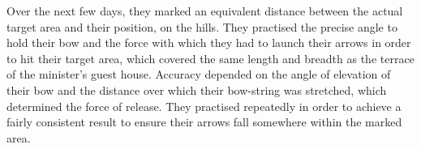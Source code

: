 Over the next few days, they marked an equivalent distance between the actual
target area and their position, on the hills. They practised the precise angle
to hold their bow and the force with which they had to launch their arrows in
order to hit their target area, which covered the same length and breadth as the
terrace of the minister's guest house. Accuracy depended on the angle of
elevation of their bow and the distance over which their bow-string was
stretched, which determined the force of release. They practised repeatedly in
order to achieve a fairly consistent result to ensure their arrows fall
somewhere within the marked area.